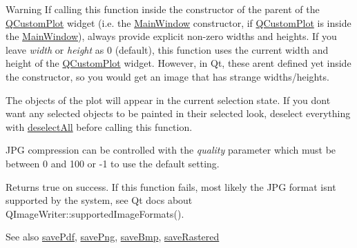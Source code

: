 \begin{DoxyWarning}{Warning}
If calling this function inside the constructor of the parent of the \hyperlink{class_q_custom_plot}{Q\+Custom\+Plot} widget (i.\+e. the \hyperlink{class_main_window}{Main\+Window} constructor, if \hyperlink{class_q_custom_plot}{Q\+Custom\+Plot} is inside the \hyperlink{class_main_window}{Main\+Window}), always provide explicit non-\/zero widths and heights. If you leave {\itshape width} or {\itshape height} as 0 (default), this function uses the current width and height of the \hyperlink{class_q_custom_plot}{Q\+Custom\+Plot} widget. However, in Qt, these aren\textquotesingle{}t defined yet inside the constructor, so you would get an image that has strange widths/heights.
\end{DoxyWarning}
The objects of the plot will appear in the current selection state. If you don\textquotesingle{}t want any selected objects to be painted in their selected look, deselect everything with \hyperlink{class_q_custom_plot_a9d4808ab925b003054085246c92a257c}{deselect\+All} before calling this function.

J\+PG compression can be controlled with the {\itshape quality} parameter which must be between 0 and 100 or -\/1 to use the default setting.

Returns true on success. If this function fails, most likely the J\+PG format isn\textquotesingle{}t supported by the system, see Qt docs about Q\+Image\+Writer\+::supported\+Image\+Formats().

\begin{DoxySeeAlso}{See also}
\hyperlink{class_q_custom_plot_a632da44c6d94ea8b271eb483b08b5114}{save\+Pdf}, \hyperlink{class_q_custom_plot_a7636261aff1f6d25c9da749ece3fc8b8}{save\+Png}, \hyperlink{class_q_custom_plot_a6629d9e8e6da4bf18055ee0257fdce9a}{save\+Bmp}, \hyperlink{class_q_custom_plot_ab528b84cf92baabe29b1d0ef2f77c93e}{save\+Rastered} 
\end{DoxySeeAlso}
